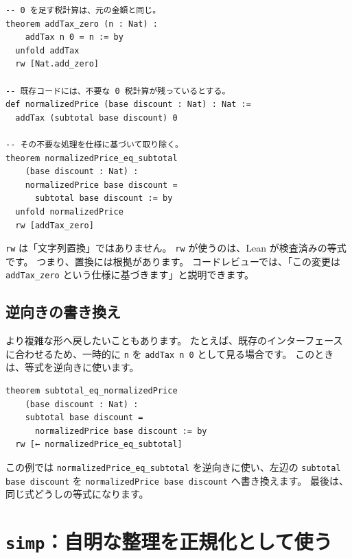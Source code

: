 \begin{listing}[htbp]
\begin{verbatim}
-- 0 を足す税計算は、元の金額と同じ。
theorem addTax_zero (n : Nat) :
    addTax n 0 = n := by
  unfold addTax
  rw [Nat.add_zero]

-- 既存コードには、不要な 0 税計算が残っているとする。
def normalizedPrice (base discount : Nat) : Nat :=
  addTax (subtotal base discount) 0

-- その不要な処理を仕様に基づいて取り除く。
theorem normalizedPrice_eq_subtotal
    (base discount : Nat) :
    normalizedPrice base discount =
      subtotal base discount := by
  unfold normalizedPrice
  rw [addTax_zero]
\end{verbatim}
\caption{\texttt{rw} による仕様ベースの置換}
\label{lst:ch18-rw}
\end{listing}

\texttt{rw} は「文字列置換」ではありません。
\texttt{rw} が使うのは、Lean が検査済みの等式です。
つまり、置換には根拠があります。
コードレビューでは、「この変更は \texttt{addTax\_zero} という仕様に基づきます」と説明できます。

\subsection{逆向きの書き換え}

より複雑な形へ戻したいこともあります。
たとえば、既存のインターフェースに合わせるため、一時的に \texttt{n} を \texttt{addTax n 0} として見る場合です。
このときは、等式を逆向きに使います。

\begin{listing}[htbp]
\begin{verbatim}
theorem subtotal_eq_normalizedPrice
    (base discount : Nat) :
    subtotal base discount =
      normalizedPrice base discount := by
  rw [← normalizedPrice_eq_subtotal]
\end{verbatim}
\caption{\texttt{rw [← ...]}}
\label{lst:ch18-rw-backward}
\end{listing}

この例では \texttt{normalizedPrice\_eq\_subtotal} を逆向きに使い、左辺の
\texttt{subtotal base discount} を \texttt{normalizedPrice base discount} へ書き換えます。
最後は、同じ式どうしの等式になります。

\section{\texttt{simp}：自明な整理を正規化として使う}

